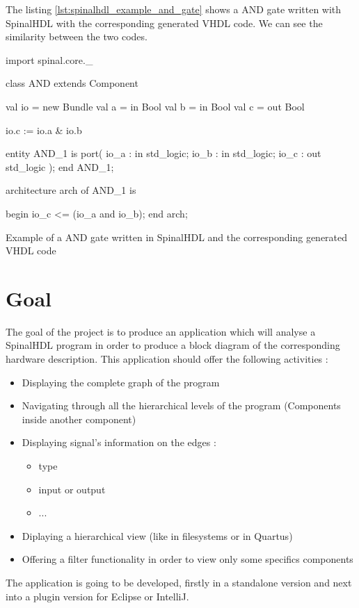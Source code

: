 The listing \ref{lst:spinalhdl_example_and_gate} shows a AND gate written with
SpinalHDL with the corresponding generated VHDL code. We can see the
similarity between the two codes.

\begin{listing}[H] %
    \centering

    \begin{minipage}[c]{0.45\textwidth}
    \begin{scalacode}
    import spinal.core._

    class AND extends Component
    {
        val io = new Bundle
        {
            val a = in Bool
            val b = in Bool
            val c = out Bool
        }

        io.c := io.a & io.b
    }
    \end{scalacode}
    \end{minipage}
    \hfill
    \begin{minipage}[c]{0.45\textwidth}
    \begin{vhdlcode}
    entity AND_1 is
        port(
            io_a : in std_logic;
            io_b : in std_logic;
            io_c : out std_logic
        );
    end AND_1;

    architecture arch of AND_1 is

    begin
      io_c <= (io_a and io_b);
    end arch;
    \end{vhdlcode}
    \end{minipage}
    \caption[SpinalHDL example and generated VHDL code]{Example of a AND gate written in SpinalHDL and the corresponding
             generated VHDL code}
    \label{lst:spinalhdl_example_and_gate}
\end{listing}

\section{Goal}
\label{sec:Goal}

The goal of the project is to produce an application which will analyse a
SpinalHDL program in order to produce a block diagram of the corresponding
hardware description. This application should offer the following activities :

\begin{itemize}
    \item Displaying the complete graph of the program
    \item Navigating through all the hierarchical levels of the program (Components
      inside another component)
    \item Displaying signal's information on the edges :
    \begin{itemize}
        \item type
        \item input or output
        \item ...
    \end{itemize}
    \item Diplaying a hierarchical view (like in filesystems or in Quartus)
    \item Offering a filter functionality in order to view only some specifics components
\end{itemize}

The application is going to be developed, firstly in a standalone version and
next into a plugin version for Eclipse or IntelliJ.

